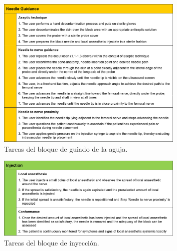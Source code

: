  \begin{figure}[th]
  \centering
    \includegraphics[width=0.8\textwidth]{IMG/needleguidance.png}
    \caption{Tareas del bloque de guiado de la aguja. }
  \label{fig:needleguidance}
\end{figure}
 \begin{figure}[th]
  \centering
    \includegraphics[width=0.8\textwidth]{IMG/injection.png}
    \caption{ Tareas del bloque de inyección.}
  \label{fig:injection}
\end{figure}



